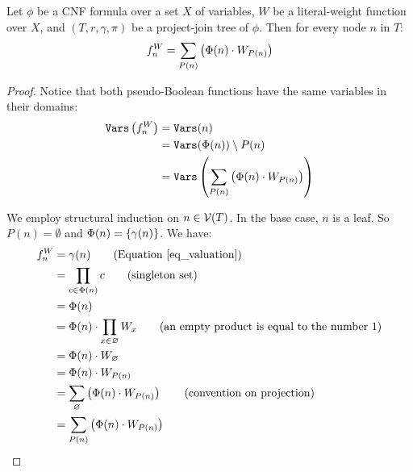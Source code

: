 \begin{lemma}
\label{lemma_valuation}
    Let $\phi$ be a CNF formula over a set $X$ of variables, $W$ be a literal-weight function over $X$, and $(T, r, \gamma, \pi)$ be a project-join tree of $\phi$.
    Then for every node $n$ in $T$:
    $$f^W_n = \sum_{P(n)} \left(  \Phi(n) \cdot W_{P(n)}  \right)$$
\end{lemma}
\begin{proof}
    Notice that both pseudo-Boolean functions have the same variables in their domains:
    \begin{align*}
        \texttt{\upshape Vars} \left( f^W_n \right)
        & = \texttt{\upshape Vars}(n) \\
        & = \texttt{\upshape Vars}(\Phi(n)) \setminus P(n) \\
        & = \texttt{\upshape Vars} \left(  \sum_{P(n)} \left(  \Phi(n) \cdot W_{P(n)}  \right)  \right)
    \end{align*}

    We employ structural induction on $n \in \mathcal{V}(T)$.
    In the base case, $n$ is a leaf.
    So $P(n) = \emptyset$ and $\Phi(n) = \left\{ \gamma(n) \right\}$.
    We have:
    \begin{align*}
        f^W_n
        & = \gamma(n) \tag{Equation \eqref{eq_valuation}} \\
        & = \prod_{c \in \Phi(n)} c \tag{singleton set} \\
        & = \Phi(n)
        \\
        & = \Phi(n) \mult \prod_{x \in \emptyset} W_x \tag{an empty product is equal to the number $1$} \\
        & = \Phi(n) \mult W_\emptyset \\
        & = \Phi(n) \mult W_{P(n)} \\
        & = \proj_{\emptyset} \pars{ \Phi(n) \mult W_{P(n)} } \tag{convention on projection} \\
        & = \proj_{P(n)} \pars{ \Phi(n) \mult W_{P(n)} }
    \end{align*}


\end{proof}
